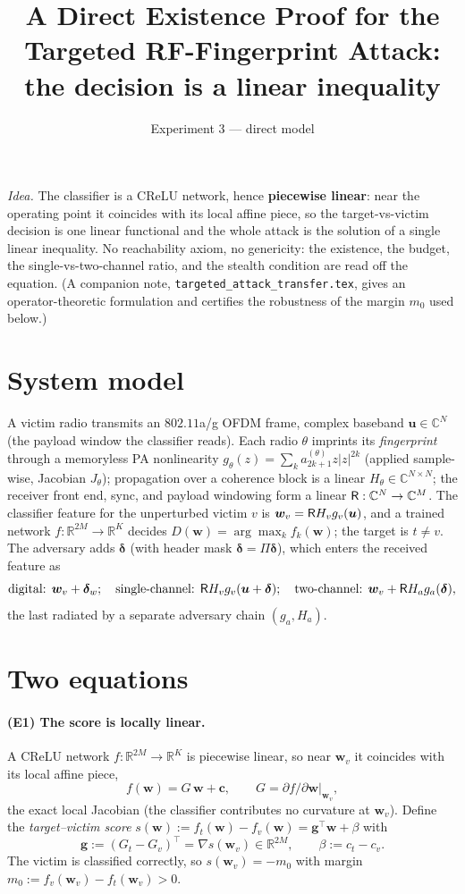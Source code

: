 \documentclass[11pt]{article}
\title{A Direct Existence Proof for the Targeted RF-Fingerprint Attack:\\
       the decision is a linear inequality}
\author{Experiment 3 --- direct model}\date{}
\newcommand{\C}{\mathbb{C}}\newcommand{\R}{\mathbb{R}}
\newcommand{\bu}{\bm u}\newcommand{\bw}{\bm w}\newcommand{\bd}{\bm\delta}\newcommand{\bg}{\bm g}
\begin{document}
\maketitle

\noindent\emph{Idea.} The classifier is a CReLU network, hence \textbf{piecewise linear}: near the
operating point it coincides with its local affine piece, so the target-vs-victim decision is one
linear functional and the whole attack is the solution of a single linear inequality. No
reachability axiom, no genericity: the existence, the budget, the single-vs-two-channel ratio, and
the stealth condition are read off the equation. (A companion note,
\texttt{targeted\_attack\_transfer.tex}, gives an operator-theoretic formulation and certifies the
robustness of the margin $m_0$ used below.)

\section{System model}

A victim radio transmits an $802.11$a/g OFDM frame, complex baseband $\bu\in\C^N$ (the payload
window the classifier reads). Each radio $\theta$ imprints its \emph{fingerprint} through a
memoryless PA nonlinearity $g_\theta(z)=\sum_{k}a^{(\theta)}_{2k+1}z\lvert z\rvert^{2k}$ (applied
sample-wise, Jacobian $J_\theta$); propagation over a coherence block is a linear
$H_\theta\in\C^{N\times N}$; the receiver front end, sync, and payload windowing form a linear
$\Rx:\C^N\to\C^M$. The classifier feature for the unperturbed victim $v$ is
$\bw_v=\Rx H_v g_v(\bu)$, and a trained network $f:\R^{2M}\to\R^K$ decides
$D(\bw)=\arg\max_k f_k(\bw)$; the target is $t\neq v$. The adversary adds $\bd$ (with header mask
$\bd=\Pi\bd$), which enters the received feature as
\[
  \text{digital: }\bw_v+\bd_w;\quad
  \text{single-channel: }\Rx H_v g_v(\bu+\bd);\quad
  \text{two-channel: }\bw_v+\Rx H_a g_a(\bd),
\]
the last radiated by a separate adversary chain $(g_a,H_a)$.

\section{Two equations}

\paragraph{(E1) The score is locally linear.} A CReLU network $f:\R^{2M}\!\to\R^{K}$ is piecewise
linear, so near $\bw_v$ it coincides with its local affine piece,
\begin{equation}\label{eq:aff}
  f(\bw)=G\,\bw+\bm c,\qquad G=\left.\partial f/\partial\bw\right|_{\bw_v} ,
\end{equation}
the exact local Jacobian (the classifier contributes no curvature at $\bw_v$). Define the
\emph{target--victim score} $s(\bw):=f_t(\bw)-f_v(\bw)=\bg^\top\bw+\beta$ with
\begin{equation}\label{eq:g}
  \bg:=(G_{t}-G_{v})^\top=\nabla s(\bw_v)\in\R^{2M},\qquad \beta:=c_t-c_v .
\end{equation}
The victim is classified correctly, so $s(\bw_v)=-m_0$ with margin $m_0:=f_v(\bw_v)-f_t(\bw_v)>0$.
\end{document}
